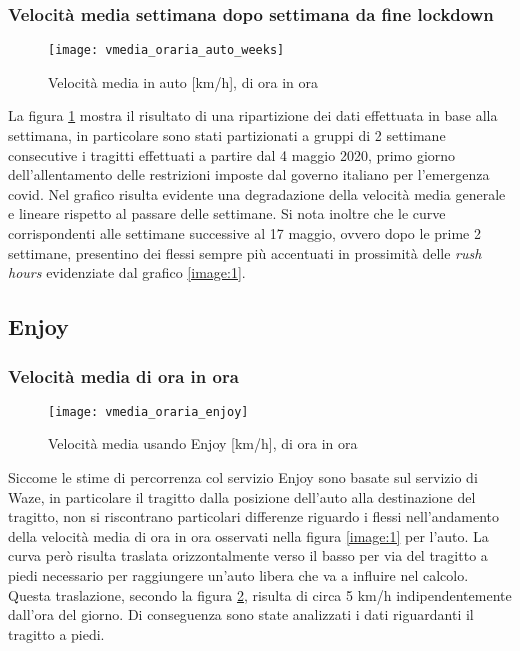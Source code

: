 \subsubsection{Velocità media settimana dopo settimana da fine lockdown}

\begin{figure}[!h]
	\texttt{[image: vmedia\_oraria\_auto\_weeks]}
	\caption{Velocità media in auto [km/h], di ora in ora}
	\label{image:3}
\end{figure}

La figura \ref{image:3} mostra il risultato di una ripartizione dei dati effettuata in base alla settimana, in particolare sono stati partizionati a gruppi di 2 settimane consecutive i tragitti effettuati a partire dal 4 maggio 2020, primo giorno dell'allentamento delle restrizioni imposte dal governo italiano per l'emergenza covid\cite{dpcm26aprile}. Nel grafico risulta evidente una degradazione della velocità media generale e lineare rispetto al passare delle settimane. Si nota inoltre che le curve corrispondenti alle settimane successive al 17 maggio, ovvero dopo le prime 2 settimane, presentino dei flessi sempre più accentuati in prossimità delle \textit{rush hours} evidenziate dal grafico \ref{image:1}.

\subsection{Enjoy}

\subsubsection{Velocità media di ora in ora}

\begin{figure}[H]
	\texttt{[image: vmedia\_oraria\_enjoy]}
	\caption{Velocità media usando Enjoy [km/h], di ora in ora}
	\label{image:4}
\end{figure}

Siccome le stime di percorrenza col servizio Enjoy sono basate sul servizio di Waze, in particolare il tragitto dalla posizione dell'auto alla destinazione del tragitto, non si riscontrano particolari differenze riguardo i flessi nell'andamento della velocità media di ora in ora osservati nella figura \ref{image:1} per l'auto. La curva però risulta traslata orizzontalmente verso il basso per via del tragitto a piedi necessario per raggiungere un'auto libera che va a influire nel calcolo. Questa traslazione, secondo la figura \ref{image:4}, risulta di circa 5 km/h indipendentemente dall'ora del giorno. Di conseguenza sono state analizzati i dati riguardanti il tragitto a piedi.

